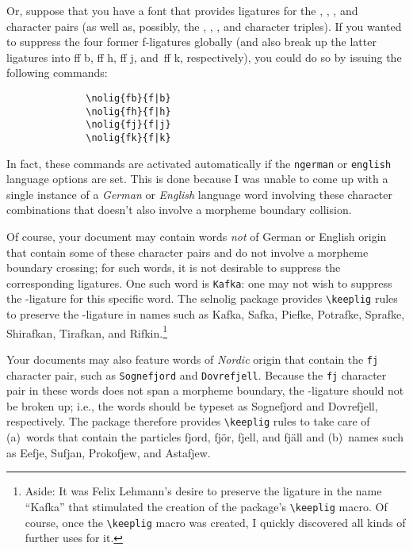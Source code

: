 \documentclass[11pt]{article}
\newcommand{\pkg}[1]{\textsf{#1}}
\newcommand{\opt}[1]{\texttt{#1}}
\newcommand{\cmmd}[1]{\texttt{\textbackslash #1}}
\begin{document}
Or, suppose that you have a font that provides ligatures for the {\ebg {}, , ,} and {\ebg{}} character pairs (as well as, possibly, the {\ebg {}, , ,} and {\ebg{}} character triples). If you wanted to suppress the four former f-ligatures globally (and also break up the latter ligatures into ff\kern0pt b, ff\kern0pt h, ff\kern0pt j, and~ff\kern0pt k, respectively), you could do so by issuing the following commands: 
\begin{Verbatim}
              \nolig{fb}{f|b}
              \nolig{fh}{f|h}
              \nolig{fj}{f|j}
              \nolig{fk}{f|k}
\end{Verbatim}
In fact, these commands are activated automatically if the \opt{ngerman} or \opt{english} language options are set. This is done because I was unable to come up with a single instance of a \emph{German} or \emph{English} language word involving these character combinations that doesn't also involve a morpheme boundary collision.

Of course, your document may contain words \emph{not} of German or English origin that contain some of these character pairs and do not involve a morpheme boundary crossing; for such words, it is not desirable to suppress the corresponding ligatures. One such word is \opt{Kafka}: one may not wish to suppress the {\ebg{}}-ligature for this specific word. The \pkg{selnolig} package provides \cmmd{keeplig} rules to preserve the {\ebg{}}-ligature in names such as {\ebg Kafka, Safka, Piefke, Potrafke, Sprafke, Shirafkan, Tirafkan}, and {\ebg Rifkin}.\footnote{Aside: It was Felix Lehmann's desire to preserve the {\ebg{}} ligature in the name \enquote{{\ebg Kafka}} that stimulated the creation of the package's \cmmd{keeplig} macro. Of course, once the \cmmd{keeplig} macro was created, I quickly discovered all kinds of further uses for it.} 

Your documents may also feature words of \emph{Nordic} origin that contain the \opt{fj} character pair, such as \opt{Sognefjord} and \opt{Dovrefjell}. Because the \opt{fj} character pair in these words does not span a morpheme boundary, the {\ebg{}}-ligature should not be broken up; i.e., the words should be typeset as {\ebg Sognefjord} and {\ebg Dovrefjell}, respectively. The package therefore provides \cmmd{keeplig} rules to take care of (a)~words that contain the particles {\ebg fjord, fjör, fjell}, and {\ebg fjäll} and (b)~names such as {\ebg Eefje, Sufjan, Prokofjew}, and {\ebg Astafjew}.
\end{document}
